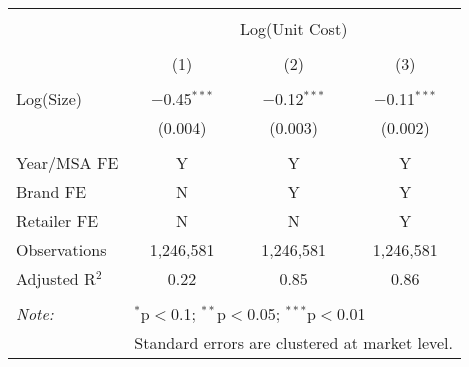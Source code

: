 
\begin{table}[!htbp] \centering 
  \caption{} 
  \label{tab:bulkDiscountUnitCost7265} 
\begin{tabular}{@{\extracolsep{5pt}}lccc} 
\\[-1.8ex]\hline 
\hline \\[-1.8ex] 
 & \multicolumn{3}{c}{Log(Unit Cost)} \\ 
\cline{2-4} 
\\[-1.8ex] & (1) & (2) & (3)\\ 
\hline \\[-1.8ex] 
 Log(Size) & $-$0.45$^{***}$ & $-$0.12$^{***}$ & $-$0.11$^{***}$ \\ 
  & (0.004) & (0.003) & (0.002) \\ 
 \hline \\[-1.8ex] 
Year/MSA FE & Y & Y & Y \\ 
Brand FE & N & Y & Y \\ 
Retailer FE & N & N & Y \\ 
Observations & 1,246,581 & 1,246,581 & 1,246,581 \\ 
Adjusted R$^{2}$ & 0.22 & 0.85 & 0.86 \\ 
\hline 
\hline \\[-1.8ex] 
\textit{Note:}  & \multicolumn{3}{l}{$^{*}$p$<$0.1; $^{**}$p$<$0.05; $^{***}$p$<$0.01} \\ 
 & \multicolumn{3}{l}{Standard errors are clustered at market level.} \\ 
\end{tabular} 
\end{table} 
